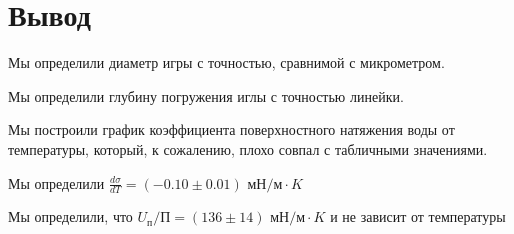 \documentclass[a4paper]{article}
\begin{document}
\section{Вывод}

Мы определили диаметр игры с точностью, сравнимой с микрометром.

Мы определили глубину погружения иглы с точностью линейки.

Мы построили график коэффициента поверхностного натяжения воды от температуры,
который, к сожалению, плохо совпал с табличными значениями.

Мы определили $\frac{d\sigma}{dT} = (-0.10 \pm 0.01)$ $ \text{мН/м} \cdot K$

Мы определили, что $U_\text{п}/\text{П} = (136 \pm 14)$ $ \text{мН/м} \cdot K$ 
и не зависит от температуры
\end{document}
